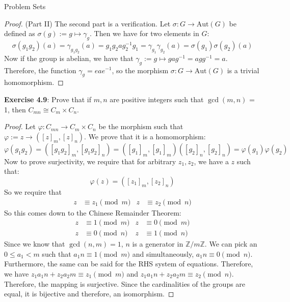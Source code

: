 \documentclass{report}
\begin{document}
\begin{exercises}{Problem Sets}
\begin{proof}
            (Part II) The second part is a verification. Let $\sigma : G \rightarrow \text{Aut}(G)$ be defined as $\sigma(g) := g \mapsto \gamma_{g}$. Then we have for two elements in $G$:
                \begin{equation*}
                    \sigma(g_{1}g_{2})(a) = \gamma_{g_{1}g_{2}}(a) = g_{1}g_{2}ag_{2}^{-1}g_{1} = \gamma_{g_{1}}\gamma_{g_{2}}(a) = \sigma(g_{1})\sigma(g_{2})(a)
                \end{equation*}
            Now if the group is abelian, we have that $\gamma_{g} := g \mapsto gag^{-1} = agg^{-1} = a$. Therefore, the function $\gamma_{g} = eae^{-1}$, so the morphism $\sigma : G \rightarrow \text{Aut}(G)$ is a trivial homomorphism.
        \end{proof}

    \textbf{Exercise 4.9}: Prove that if $m, n$ are positive integers such that $\gcd(m, n)$ = 1, then $C_{mn} \cong C_{m} \times C_{n}$.
        \begin{proof}
            Let $\varphi : C_{mn} \rightarrow C_{m} \times C_{n}$ be the morphism such that $\varphi := z \rightarrow ([z]_{m}, [z]_{n})$. We prove that it is a homomorphism: 
                \begin{equation*}
                    \varphi(g_{1}g_{2}) = ([g_{1}g_{2}]_{m}, [g_{1}g_{2}]_{n}) = ([g_{1}]_{m}, [g_{1}]_{m})([g_{2}]_{n}, [g_{2}]_{n}) = \varphi(g_{1})\varphi(g_{2})
                \end{equation*}
            Now to prove surjectivity, we require that for arbitrary $z_{1}, z_{2}$, we have a $z$ such that:
                \begin{equation*}
                    \varphi(z) = ([z_{1}]_{m}, [z_{2}]_{n})
                \end{equation*}
            So we require that 
                \begin{align*}
                    z &\equiv  z_{1} \pmod{m} & z &\equiv  z_{2} \pmod{n}   
                \end{align*}
            So this comes down to the Chinese Remainder Theorem:
                \begin{align*}
                    z &\equiv  1 \pmod{m} & z &\equiv  0 \pmod{m} \\
                    z &\equiv  0 \pmod{n} & z &\equiv  1 \pmod{n}   
                \end{align*}
            Since we know that $\gcd(n, m) = 1$, $n$ is a generator in $\mathbb{Z}/m\mathbb{Z}$. We can pick an $0 \leq a_{1} < m$ such that $a_{1}n \equiv 1 \pmod{m}$ and simultaneously, $a_{1}n \equiv 0 \pmod{n}$. Furthermore, the same can be said for the RHS system of equations. Therefore, we have $z_{1}a_{1}n + z_{2}a_{2}m \equiv z_{1} \pmod{m}$ and $z_{1}a_{1}n + z_{2}a_{2}m \equiv z_{2} \pmod{n}$. Therefore, the mapping is surjective. Since the cardinalities of the groups are equal, it is bijective and therefore, an isomorphism.
        \end{proof}


\end{exercises}
\end{document}
